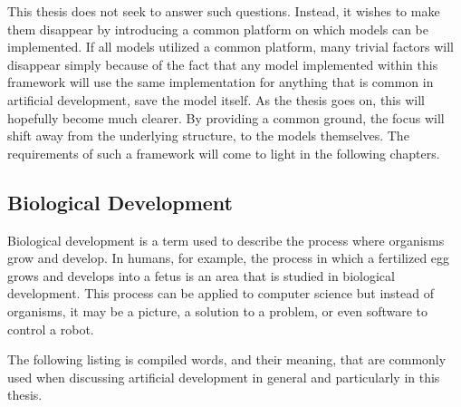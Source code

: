 This thesis does not seek to answer such questions. Instead, it wishes to make them disappear by introducing a common platform on which models can be implemented. If all models utilized a common platform, many trivial factors will disappear simply because of the fact that any model implemented within this framework will use the same implementation for anything that is common in artificial development, save the model itself. As the thesis goes on, this will hopefully become much clearer. By providing a common ground, the focus will shift away from the underlying structure, to the models themselves. The requirements of such a framework will come to light in the following chapters.

\subsection{Biological Development}
Biological development is a term used to describe the process where organisms grow and develop. In humans, for example, the process in which a fertilized egg grows and develops into a fetus is an area that is studied in biological development. This process can be applied to computer science but instead of organisms, it may be a picture, a solution to a problem, or even software to control a robot.

The following listing is compiled words, and their meaning, that are commonly used when discussing artificial development in general and particularly in this thesis.

